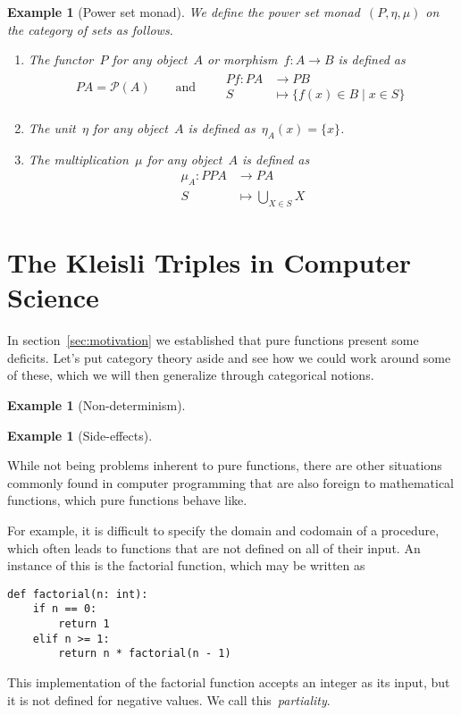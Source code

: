 \documentclass[a4paper]{article}
\theoremstyle{plain}
\newtheorem{example}[theorem]{Example}
\theoremstyle{definition}
\begin{document}
\begin{example}[Power set monad]
    \label{monad:power-set}
    We define the power set monad~\((P,\eta,\mu)\) on the category of sets as
    follows.
    \begin{enumerate}
        \item The functor~\(P\) for any object~\(A\) or
            morphism~\(f:A\longrightarrow B\) is defined as
            \begin{gather*}
                PA = \mathcal{P}(A)
                \qquad\text{and}\qquad
                \begin{split}
                    Pf:PA&\longrightarrow PB \\
                    S&\longmapsto\{f(x)\in B \mid x\in S\}
                \end{split}
            \end{gather*}
        \item The unit~\(\eta\) for any object~\(A\) is defined
            as~\(\eta_{A}(x)=\{x\}\).
        \item The multiplication~\(\mu\) for any object~\(A\) is defined as
            \begin{align*}
                \mu_{A}:PPA&\longrightarrow PA \\
                S&\longmapsto \bigcup_{X\in S}X
            \end{align*}
    \end{enumerate}
\end{example}

\section{The Kleisli Triples in Computer Science}
In section~\ref{sec:motivation} we established that pure functions present some
deficits. Let's put category theory aside and see how we could work around some
of these, which we will then generalize through categorical notions.
\begin{example}[Non-determinism]
\end{example}
\begin{example}[Side-effects]
\end{example}

While not being problems inherent to pure functions, there are other situations
commonly found in computer programming that are also foreign to mathematical
functions, which pure functions behave like.

For example, it is difficult to specify the domain and codomain of a procedure,
which often leads to functions that are not defined on all of their input. An
instance of this is the factorial function, which may be written as
\begin{verbatim}
def factorial(n: int):
    if n == 0:
        return 1
    elif n >= 1:
        return n * factorial(n - 1)
\end{verbatim}
This implementation of the factorial function accepts an integer as its input,
but it is not defined for negative values. We call this~\emph{partiality}.
\end{document}

